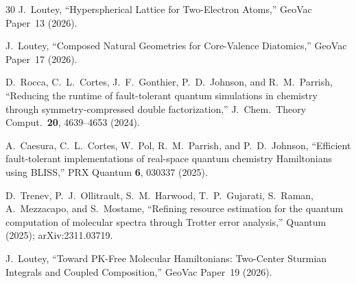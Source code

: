 \documentclass[aps,pra,twocolumn,superscriptaddress,longbibliography]{revtex4-2}
\begin{document}
\begin{thebibliography}{30}
J.~Loutey,
``Hyperspherical Lattice for Two-Electron Atoms,''
GeoVac Paper~13 (2026).

J.~Loutey,
``Composed Natural Geometries for Core-Valence Diatomics,''
GeoVac Paper~17 (2026).

D.~Rocca, C.~L.~Cortes, J.~F.~Gonthier, P.~D.~Johnson, and R.~M.~Parrish,
``Reducing the runtime of fault-tolerant quantum simulations in chemistry
through symmetry-compressed double factorization,''
J.\ Chem.\ Theory Comput.\ \textbf{20}, 4639--4653 (2024).

A.~Caesura, C.~L.~Cortes, W.~Pol, R.~M.~Parrish, and P.~D.~Johnson,
``Efficient fault-tolerant implementations of real-space quantum chemistry
Hamiltonians using BLISS,''
PRX Quantum \textbf{6}, 030337 (2025).

D.~Trenev, P.~J.~Ollitrault, S.~M.~Harwood, T.~P.~Gujarati,
S.~Raman, A.~Mezzacapo, and S.~Mostame,
``Refining resource estimation for the quantum computation of
molecular spectra through Trotter error analysis,''
Quantum (2025); arXiv:2311.03719.

J.~Loutey,
``Toward PK-Free Molecular Hamiltonians: Two-Center Sturmian
Integrals and Coupled Composition,''
GeoVac Paper~19 (2026).

\end{thebibliography}
\end{document}
